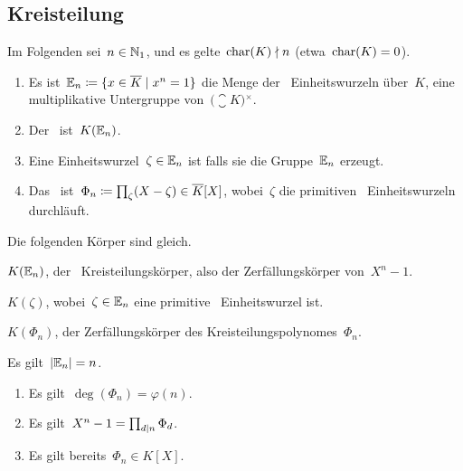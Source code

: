 \subsection{Kreisteilung}

\begin{convention}
  Im Folgenden sei~$n \in \mathbb{N}_1$, und es gelte~$\operatorname{char}(K) \nmid n$ (etwa~$\operatorname{char}(K) = 0$).
\end{convention}

\begin{definition}
  \leavevmode
  \begin{enumerate}
    \item
      Es ist~$\Ein_n \defined \{ x \in \closure{K} \suchthat x^n = 1 \}$ die Menge der~ Einheitswurzeln über~$K$, eine multiplikative Untergruppe von~$\bigl( \closure{K} \bigr){}^\times$.
    \item
      Der~  ist~$K(\operatorname{\mathbb{E}}_n)$.
    \item
      Eine Einheitswurzel~$\zeta \in \operatorname{\mathbb{E}}_n$ ist  falls sie die Gruppe~$\operatorname{\mathbb{E}}_n$ erzeugt.
    \item
      Das~  ist~$\Phi_n \coloneqq \prod_{\zeta} (X - \zeta) \in \overline{K}[X]$, wobei~$\zeta$ die primitiven~ Einheitswurzeln durchläuft.
  \end{enumerate}
\end{definition}

\begin{proposition}
  Die folgenden Körper sind gleich.
  \begin{equivlist}
    \item
      $K( \operatorname{\mathbb{E}}_n )$, der~ Kreisteilungskörper, also der Zerfällungskörper von~$X^n - 1$.
    \item
      $K( \zeta )$, wobei~$\zeta \in \operatorname{\mathbb{E}}_n$ eine primitive~ Einheitswurzel ist.
    \item
      $K( \Phi_n )$, der Zerfällungskörper des Kreisteilungspolynomes~$\Phi_n$.
  \end{equivlist}
\end{proposition}

\begin{lemma}
  Es gilt~$\lvert \operatorname{\mathbb{E}}_n \rvert = n$.
\end{lemma}

\begin{proposition}
  \leavevmode
  \begin{enumerate}
    \item
      Es gilt~$\deg( \Phi_n ) = \varphi(n)$.
    \item
      Es gilt~$X^n - 1 = \prod_{d \mid n} \Phi_d$.
    \item
      Es gilt bereits~$\Phi_n \in K[X]$.
  \end{enumerate}
\end{proposition}

